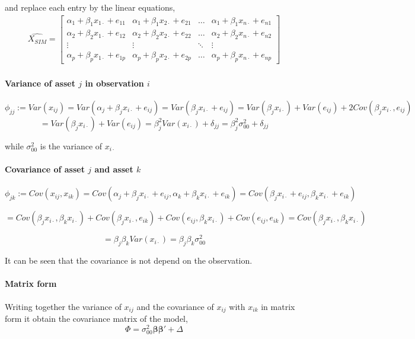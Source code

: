 \documentclass[letterpaper]{article}
\begin{document}
	
	and replace each entry by the linear equations, 
	\begin{align*} 
	\hat{X_{SIM}} =  
	\begin{bmatrix}
	\alpha_{1} + \beta_{1}x_{1\cdot} + e_{11} & \alpha_{1} + \beta_{1}x_{2\cdot} + e_{21} & \dots  & \alpha_{1} + \beta_{1}x_{n\cdot} + e_{n1}   \\
	\alpha_{2} + \beta_{2}x_{1\cdot} + e_{12} & \alpha_{2} + \beta_{2}x_{2\cdot} + e_{22} & \dots  & \alpha_{2} + \beta_{2}x_{n\cdot} + e_{n2}\\
	\vdots     & \vdots     & \ddots  & \vdots		\\
	\alpha_{p} + \beta_{p}x_{1\cdot} + e_{1p} & \alpha_{p} + \beta_{p}x_{2\cdot} + e_{2p}& \dots  & \alpha_{p} + \beta_{p}x_{n\cdot} + e_{np}
	\end{bmatrix}
	\end{align*}
	
	\paragraph{Variance of asset \(j\) in observation \(i\)}
	\[\phi_{jj} := Var(x_{ij})  = Var(\alpha_{j} + \beta_{j}x_{i\cdot} + e_{ij}) = Var(\beta_{j}x_{i\cdot} + e_{ij}) = Var(\beta_{j}x_{i\cdot}) + Var(e_{ij}) + 2Cov(\beta_{j}x_{i\cdot}, e_{ij}) \]
	\[= Var(\beta_{j}x_{i\cdot}) + Var(e_{ij}) = \beta_{j}^{2}Var(x_{i\cdot}) + \delta_{jj} =  \beta_{j}^{2}\sigma_{00}^{2} +\delta_{jj}  \]
	
	while \(\sigma_{00}^{2}\) is the variance of \(x_{i\cdot}\)\\
	
	\paragraph{Covariance of asset \(j\) and asset \(k\)}
	\[\phi_{jk} := Cov(x_{ij}, x_{ik})  = Cov(\alpha_{j} + \beta_{j}x_{i\cdot} + e_{ij}, \alpha_{k} + \beta_{k}x_{i\cdot} + e_{ik}) = Cov(\beta_{j}x_{i\cdot} + e_{ij}, \beta_{k}x_{i\cdot} + e_{ik}) \]
	
	\[= Cov(\beta_{j}x_{i\cdot}, \beta_{k}x_{i\cdot}) + Cov(\beta_{j}x_{i\cdot}, e_{ik}) + Cov(e_{ij}, \beta_{k}x_{i\cdot}) + Cov(e_{ij},e_{ik}) = Cov(\beta_{j}x_{i\cdot}, \beta_{k}x_{i\cdot})\]
	
	\[= \beta_{j}\beta_{k}Var(x_{i\cdot}) = \beta_{j}\beta_{k}\sigma_{00}^{2}\]
	
	It can be seen that the covariance is not depend on the observation.
	
	\paragraph{Matrix form}
	Writing together the variance of \(x_{ij}\) and the covariance of \(x_{ij}\) with \(x_{ik}\) in matrix form it obtain the covariance matrix of the model, 
	\[\Phi = \sigma_{00}^{2}\boldsymbol{\beta}\boldsymbol{\beta}' +\Delta \]
	
\end{document}
